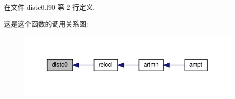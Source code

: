 在文件 distc0.\+f90 第 2 行定义.

这是这个函数的调用关系图\+:
\nopagebreak
\begin{figure}[H]
\begin{center}
\leavevmode
\includegraphics[width=350pt]{distc0_8f90_a3d29bb4aa6c6b2a142adef876b0ebee8_icgraph}
\end{center}
\end{figure}
